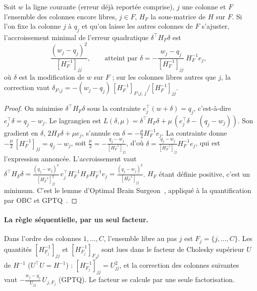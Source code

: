 \begin{lemme}\label{t3ecl:lem:obs}
Soit $w$ la ligne courante (erreur déjà reportée comprise), $j$ une colonne et $F$ l'ensemble des colonnes encore libres, $j \in F$, $H_F$ la sous-matrice de $H$ sur $F$. Si l'on fixe la colonne $j$ à $q_j$ et qu'on laisse les autres colonnes de $F$ s'ajuster, l'accroissement minimal de l'erreur quadratique $\delta^\top H_F \delta$ est
\begin{equation}\label{t3ecl:eq:obs}
\frac{(w_j - q_j)^2}{[H_F^{-1}]_{jj}}, \qquad \text{atteint par } \delta = -\frac{w_j - q_j}{[H_F^{-1}]_{jj}}\ H_F^{-1} e_j ,
\end{equation}
où $\delta$ est la modification de $w$ sur $F$ ; sur les colonnes libres autres que $j$, la correction vaut $\delta_{F\setminus j} = -(w_j - q_j)\,[H_F^{-1}]_{F\setminus j,\,j} / [H_F^{-1}]_{jj}$.
\end{lemme}

\begin{proof}
On minimise $\delta^\top H_F \delta$ sous la contrainte $e_j^\top (w + \delta) = q_j$, c'est-à-dire $e_j^\top \delta = q_j - w_j$. Le lagrangien est $L(\delta, \mu) = \delta^\top H_F \delta + \mu\,(e_j^\top \delta - (q_j - w_j))$. Son gradient en $\delta$, $2 H_F \delta + \mu e_j$, s'annule en $\delta = -\frac{\mu}{2} H_F^{-1} e_j$. La contrainte donne $-\frac{\mu}{2}\,[H_F^{-1}]_{jj} = q_j - w_j$, soit $\frac{\mu}{2} = -\frac{q_j - w_j}{[H_F^{-1}]_{jj}}$, d'où $\delta = \frac{q_j - w_j}{[H_F^{-1}]_{jj}} H_F^{-1} e_j$, qui est l'expression annoncée. L'accroissement vaut $\delta^\top H_F \delta = \frac{(q_j - w_j)^2}{[H_F^{-1}]_{jj}^2}\, e_j^\top H_F^{-1} H_F H_F^{-1} e_j = \frac{(q_j - w_j)^2}{[H_F^{-1}]_{jj}}$. $H_F$ étant définie positive, c'est un minimum. C'est le lemme d'Optimal Brain Surgeon~\cite{hassibi1992obs}, appliqué à la quantification par OBC et GPTQ~\cite{frantar2022obc,frantar2022gptq}.
\end{proof}

\paragraph{La règle séquentielle, par un seul facteur.} Dans l'ordre des colonnes $1, \ldots, C$, l'ensemble libre au pas $j$ est $F_j = \{j, \ldots, C\}$. Les quantités $[H_{F_j}^{-1}]_{jj}$ et $[H_{F_j}^{-1}]_{F_j j}$ sont lues dans le facteur de Cholesky supérieur $U$ de $H^{-1}$ ($U^\top U = H^{-1}$) : $[H_{F_j}^{-1}]_{jj} = U_{jj}^2$, et la correction des colonnes suivantes vaut $-\frac{w_j - q_j}{U_{jj}}\, U_{j, F_j}$ (GPTQ). Le facteur se calcule par une seule factorisation.

